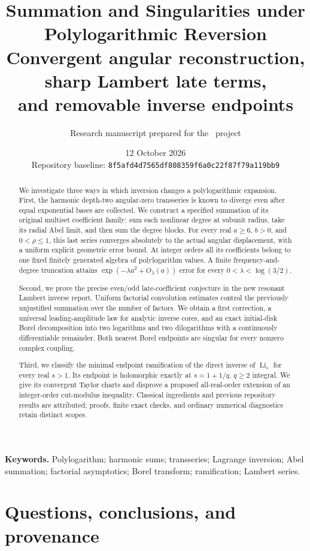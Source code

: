 \documentclass[11pt,a4paper]{article}
\title{\color{ink}\bfseries Summation and Singularities under\\
Polylogarithmic Reversion\\[6pt]
\large\mdseries Convergent angular reconstruction, sharp Lambert late terms,\\
and removable inverse endpoints}
\author{Research manuscript prepared for the \repo\ project}
\date{12 October 2026\\[3pt]\small Repository baseline:
\texttt{8f5afd4d7565df808359f6a0c22f87f79a119bb9}}
\theoremstyle{definition}
\theoremstyle{remark}
\numberwithin{equation}{section}
\DeclareMathOperator{\Li}{Li}
\begin{document}
\maketitle
\begin{abstract}
We investigate three ways in which inversion changes a polylogarithmic
expansion. First, the harmonic depth-two angular-zero transseries is known
to diverge even after equal exponential bases are collected. We construct
a specified summation of its original multiset coefficient family:
sum each nonlinear degree at subunit radius, take its radial Abel limit,
and then sum the degree blocks. For every real $a\ge6$, $b>0$, and
$0<\rho\le1$, this last series converges absolutely to the actual angular
displacement, with a uniform explicit geometric error bound. At integer orders
all its coefficients belong to one fixed finitely generated algebra of
polylogarithm values. A finite frequency-and-degree truncation attains
$\exp(-\lambda a^2+O_\lambda(a))$ error for every
$0<\lambda<\log(3/2)$.

Second, we prove the precise even/odd late-coefficient conjecture in the
new resonant Lambert inverse report. Uniform factorial convolution
estimates control the previously unjustified summation over the number
of factors. We obtain a first correction, a universal leading-amplitude
law for analytic inverse cores, and an exact initial-disk Borel
decomposition into two logarithms and two dilogarithms with a continuously
differentiable remainder. Both nearest Borel endpoints are singular for
every nonzero complex coupling.

Third, we classify the minimal endpoint ramification of the direct
inverse of $\Li_s$ for every real $s>1$. Its endpoint is holomorphic
exactly at $s=1+1/q$, $q\ge2$ integral. We give its convergent Taylor
charts and disprove a proposed all-real-order extension of an
integer-order cut-modulus inequality. Classical ingredients and previous
repository results are attributed; proofs, finite exact checks, and
ordinary numerical diagnostics retain distinct scopes.
\end{abstract}
\noindent\textbf{Keywords.} Polylogarithm; harmonic sums; transseries;
Lagrange inversion; Abel summation; factorial asymptotics; Borel transform;
ramification; Lambert series.
\newpage
\begingroup\setlength{\parskip}{0pt}\tableofcontents\endgroup
\newpage

\section{Questions, conclusions, and provenance}
\label{sec:scope}
\end{document}
